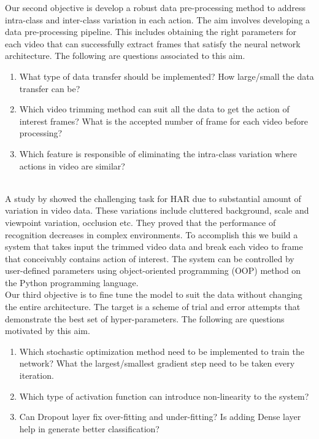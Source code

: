Our second objective is develop a robust data pre-processing  method to address intra-class and inter-class variation in each action.
The aim involves developing a data pre-processing pipeline. This includes obtaining the right parameters for each video that can successfully extract frames that satisfy the neural network architecture. The following are questions associated to this aim.
\begin{enumerate}
    \item What type of data transfer should be implemented? How large/small the data transfer can be?  
    \item Which video trimming method can suit all the data to get the action of interest frames? What is the accepted number of frame for each video before processing? 
    \item Which feature is responsible of eliminating the intra-class variation where actions in video are similar?
    \end{enumerate}\\
A study by  \cite{nazir2017inter} showed the challenging task for HAR due to substantial amount of variation in video data. These variations include cluttered background, scale and viewpoint variation, occlusion etc. They proved that the performance of recognition decreases in complex environments. To accomplish this we build a system that takes input the trimmed video data and break each video to frame that conceivably contains action of interest. The system can be controlled by user-defined parameters using object-oriented programming (OOP) method on the Python programming language.\\

Our third objective is to fine tune the model to suit the data without changing the entire architecture.
The target is a scheme of trial and error attempts that demonstrate the best set of hyper-parameters. The following are questions motivated by this aim.
\begin{enumerate}
    \item Which stochastic optimization method need to be implemented to train the network? What the largest/smallest gradient step need to be taken every iteration.
    \item Which type of activation function can introduce non-linearity to the system? 
    \item Can Dropout layer fix  over-fitting and under-fitting? Is adding Dense layer help in generate better classification?
    \end{enumerate}\\
    
